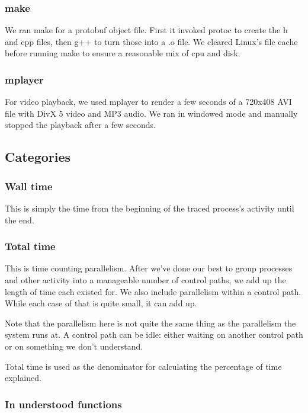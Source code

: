 \documentclass[10pt]{article}
\begin{document}
\subsubsection{make}

We ran make for a protobuf object file.  First it invoked protoc to create the h and cpp files, then g++ to turn those into a .o file.  We cleared Linux's file cache before running make to ensure a reasonable mix of cpu and disk.

\subsubsection{mplayer}

For video playback, we used mplayer to render a few seconds of a 720x408 AVI file with DivX 5 video and MP3 audio.  We ran in windowed mode and manually stopped the playback after a few seconds.

\subsection{Categories}

\subsubsection{Wall time}

This is simply the time from the beginning of the traced process's activity until the end.

\subsubsection{Total time}

This is time counting parallelism.  After we've done our best to group processes and other activity into a manageable number of control paths, we add up the length of time each existed for.  We also include parallelism within a control path.  While each case of that is quite small, it can add up.

Note that the parallelism here is not quite the same thing as the parallelism the system runs at.  A control path can be idle: either waiting on another control path or on something we don't understand.

Total time is used as the denominator for calculating the percentage of time explained.

\subsubsection{In understood functions}
\end{document}
